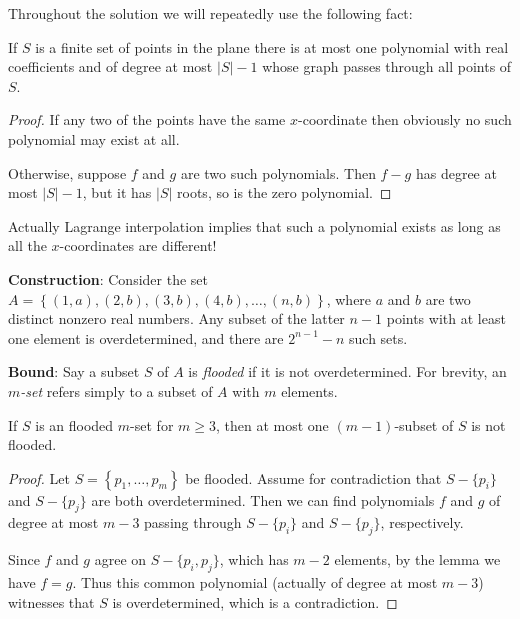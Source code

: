 \documentclass[11pt]{scrartcl}
\begin{document}
Throughout the solution we will repeatedly use the following fact:
\begin{lemma*}
  If $S$ is a finite set of points in the plane
  there is at most one polynomial with real coefficients
  and of degree at most $|S|-1$
  whose graph passes through all points of $S$.
\end{lemma*}
\begin{proof}
  If any two of the points have the same $x$-coordinate
  then obviously no such polynomial may exist at all.

  Otherwise, suppose $f$ and $g$ are two such polynomials.
  Then $f-g$ has degree at most $|S|-1$,
  but it has $|S|$ roots, so is the zero polynomial.
\end{proof}
\begin{remark*}
  Actually Lagrange interpolation implies
  that such a polynomial exists
  as long as all the $x$-coordinates are different!
\end{remark*}

\medskip

\textbf{Construction}:
Consider the set $A = \left\{ (1,a), (2,b), (3,b), (4,b), \dots, (n,b) \right\}$,
where $a$ and $b$ are two distinct nonzero real numbers.
Any subset of the latter $n-1$ points with at least one element
is overdetermined, and there are $2^{n-1}-n$ such sets.

\medskip

\textbf{Bound}:
Say a subset $S$ of $A$ is \emph{flooded}
if it is not overdetermined.
For brevity, an \emph{$m$-set}
refers simply to a subset of $A$ with $m$ elements.

\begin{claim*}
  If $S$ is an flooded $m$-set for $m \ge 3$,
  then at most one $(m-1)$-subset of $S$ is not flooded.
\end{claim*}
\begin{proof}
  Let $S = \left\{ p_1, \dots, p_m \right\}$ be flooded.
  Assume for contradiction that $S - \{p_i\}$
  and $S - \{p_j\}$ are both overdetermined.
  Then we can find polynomials $f$ and $g$ of degree at most $m-3$
  passing through $S - \{p_i\}$ and $S - \{p_j\}$, respectively.

  Since $f$ and $g$ agree on $S - \{p_i, p_j\}$,
  which has $m-2$ elements, by the lemma we have $f = g$.
  Thus this common polynomial (actually of degree at most $m-3$)
  witnesses that $S$ is overdetermined,
  which is a contradiction.
\end{proof}
\end{document}
